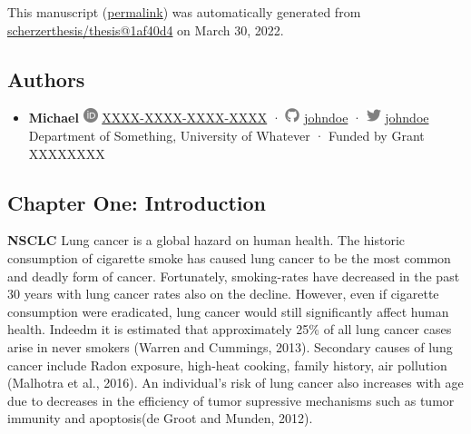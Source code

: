 This manuscript
(\href{https://scherzerthesis.github.io/thesis/v/1af40d40f8291eb85788543d7614044c788929f1/}{permalink})
was automatically generated
from \href{https://github.com/scherzerthesis/thesis/tree/1af40d40f8291eb85788543d7614044c788929f1}{scherzerthesis/thesis@1af40d4}
on March 30, 2022.

\hypertarget{authors}{%
\subsection{Authors}\label{authors}}

\begin{itemize}
\tightlist
\item
  \textbf{Michael}
  \includegraphics[width=0.16667in,height=0.16667in]{images/orcid.svg}
  \href{https://orcid.org/XXXX-XXXX-XXXX-XXXX}{XXXX-XXXX-XXXX-XXXX}
  · \includegraphics[width=0.16667in,height=0.16667in]{images/github.svg}
  \href{https://github.com/johndoe}{johndoe}
  · \includegraphics[width=0.16667in,height=0.16667in]{images/twitter.svg}
  \href{https://twitter.com/johndoe}{johndoe}
  Department of Something, University of Whatever
  · Funded by Grant XXXXXXXX
\end{itemize}

\hypertarget{chapter-one-introduction}{%
\subsection{Chapter One: Introduction}\label{chapter-one-introduction}}

\textbf{NSCLC} Lung cancer is a global hazard on human health. The historic consumption of cigarette smoke has caused lung cancer to be the most common and deadly form of cancer. Fortunately, smoking-rates have decreased in the past 30 years with lung cancer rates also on the decline. However, even if cigarette consumption were eradicated, lung cancer would still significantly affect human health. Indeedm it is estimated that approximately 25\% of all lung cancer cases arise in never smokers (Warren and Cummings, 2013). Secondary causes of lung cancer include Radon exposure, high-heat cooking, family history, air pollution (Malhotra et al., 2016). An individual's risk of lung cancer also increases with age due to decreases in the efficiency of tumor supressive mechanisms such as tumor immunity and apoptosis(de Groot and Munden, 2012).

